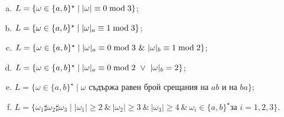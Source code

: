 {\begin{problem}
\begin{enumerate}[a)]
    $L = \{\omega \in \{a,b\}^\star \mid \text{ всяко }a\text{ в }\omega\text{ се следва от поне едно }b\}$;
  \item
    $L = \{\omega \in \{a,b\}^\star \mid \vert{\omega}\vert \equiv 0 \bmod 3\}$;
  \item
    $L = \{\omega \in \{a,b\}^\star \mid \vert{\omega}\vert_{a} \equiv 1 \bmod 3\}$;
  \item
    $L = \{\omega \in \{a,b\}^\star \mid \vert{\omega}\vert_{a} \equiv 0 \bmod 3\ \&\ \vert{\omega}\vert_{b} \equiv 1 \bmod 2\}$;
  \item
    $L = \{\omega \in \{a,b\}^\star \mid \vert{\omega}\vert_{a} \equiv 0 \bmod 2\ \vee\ \vert{\omega}\vert_{b} = 2\}$;
  \item
    $L = \{\omega \in \{a,b\}^\star \mid \omega \text{ съдържа равен брой срещания на }ab\text{ и на }ba\}$;
  \item
    $L = \{\omega_1 \sharp \omega_2 \sharp \omega_3 \mid |\omega_1| \geq 2\ \&\ |\omega_2| \geq 3\ \&\ |\omega_3| \geq 4\ \&\ \omega_i \in \{a,b\}^\star\text{
      за }i = 1,2,3\}$.
  \end{enumerate}
\end{problem}

}

